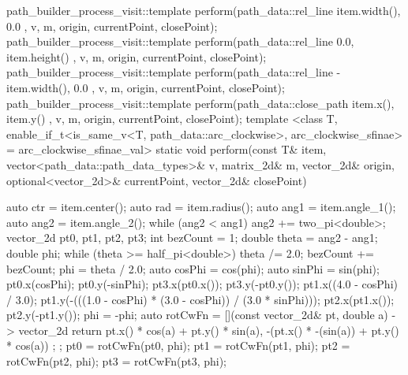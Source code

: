 \begin{codeblock}
{{{        path_builder_process_visit::template perform(path_data::rel_line{ { item.width(), 0.0 } }, v, m, origin, currentPoint, closePoint);
        path_builder_process_visit::template perform(path_data::rel_line{ { 0.0, item.height() } }, v, m, origin, currentPoint, closePoint);
        path_builder_process_visit::template perform(path_data::rel_line{ { -item.width(), 0.0 } }, v, m, origin, currentPoint, closePoint);
        path_builder_process_visit::template perform(path_data::close_path{ { item.x(), item.y() } }, v, m, origin, currentPoint, closePoint);
      }
      template <class T, enable_if_t<is_same_v<T, path_data::arc_clockwise>, arc_clockwise_sfinae> = arc_clockwise_sfinae_val>
      static void perform(const T& item, vector<path_data::path_data_types>& v, matrix_2d& m, vector_2d& origin, optional<vector_2d>& currentPoint, vector_2d& closePoint) {
        {
          auto ctr = item.center();
          auto rad = item.radius();
          auto ang1 = item.angle_1();
          auto ang2 = item.angle_2();
          while (ang2 < ang1) {
            ang2 += two_pi<double>;
          }
          vector_2d pt0, pt1, pt2, pt3;
          int bezCount = 1;
          double theta = ang2 - ang1;
          double phi{};
          while (theta >= half_pi<double>) {
            theta /= 2.0;
            bezCount += bezCount;
          }
          phi = theta / 2.0;
          auto cosPhi = cos(phi);
          auto sinPhi = sin(phi);
          pt0.x(cosPhi);
          pt0.y(-sinPhi);
          pt3.x(pt0.x());
          pt3.y(-pt0.y());
          pt1.x((4.0 - cosPhi) / 3.0);
          pt1.y(-(((1.0 - cosPhi) * (3.0 - cosPhi)) / (3.0 * sinPhi)));
          pt2.x(pt1.x());
          pt2.y(-pt1.y());
          phi = -phi;
          auto rotCwFn = [](const vector_2d& pt, double a) -> vector_2d {
            return { pt.x() * cos(a) + pt.y() * sin(a),
              -(pt.x() * -(sin(a)) + pt.y() * cos(a)) };
          };
          pt0 = rotCwFn(pt0, phi);
          pt1 = rotCwFn(pt1, phi);
          pt2 = rotCwFn(pt2, phi);
          pt3 = rotCwFn(pt3, phi);
  
}}}}
\end{codeblock}
